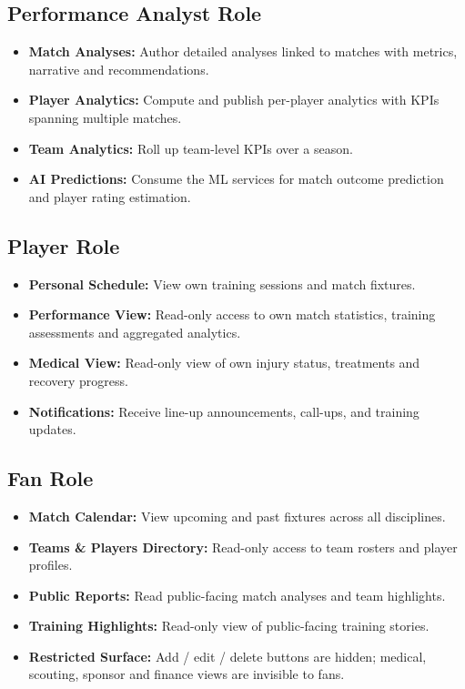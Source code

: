 \documentclass[12pt,a4paper,oneside]{report}
\begin{document}
\subsection*{Performance Analyst Role}
\begin{itemize}[leftmargin=*]
  \item \textbf{Match Analyses:} Author detailed analyses linked to
        matches with metrics, narrative and recommendations.
  \item \textbf{Player Analytics:} Compute and publish per-player
        analytics with KPIs spanning multiple matches.
  \item \textbf{Team Analytics:} Roll up team-level KPIs over a
        season.
  \item \textbf{AI Predictions:} Consume the ML services for match
        outcome prediction and player rating estimation.
\end{itemize}

\subsection*{Player Role}
\begin{itemize}[leftmargin=*]
  \item \textbf{Personal Schedule:} View own training sessions and
        match fixtures.
  \item \textbf{Performance View:} Read-only access to own match
        statistics, training assessments and aggregated analytics.
  \item \textbf{Medical View:} Read-only view of own injury status,
        treatments and recovery progress.
  \item \textbf{Notifications:} Receive line-up announcements,
        call-ups, and training updates.
\end{itemize}

\subsection*{Fan Role}
\begin{itemize}[leftmargin=*]
  \item \textbf{Match Calendar:} View upcoming and past fixtures
        across all disciplines.
  \item \textbf{Teams \& Players Directory:} Read-only access to team
        rosters and player profiles.
  \item \textbf{Public Reports:} Read public-facing match analyses and
        team highlights.
  \item \textbf{Training Highlights:} Read-only view of public-facing
        training stories.
  \item \textbf{Restricted Surface:} Add / edit / delete buttons are
        hidden; medical, scouting, sponsor and finance views are
        invisible to fans.
\end{itemize}
\end{document}
